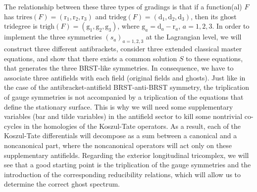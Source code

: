 \documentclass[a4paper,12pt]{article}
\begin{document}
The relationship between these three types of gradings is that if a
function(al) $F$ has $\mathrm{trires}\left( F\right) =\left( \mathrm{r}_{1},%
\mathrm{r}_{2},\mathrm{r}_{3}\right) $ and $\mathrm{trideg}\left( F\right)
=\left( \mathrm{d}_{1},\mathrm{d}_{2},\mathrm{d}_{3}\right) $, then its
ghost tridegree is $\mathrm{trigh}\left( F\right) =\left( \mathrm{g}_{1},%
\mathrm{g}_{2},\mathrm{g}_{3}\right) $, where $\mathrm{g}_{a}=\mathrm{d}_{a}-%
\mathrm{r}_{a}$, $a=1,2,3$. In order to implement the three symmetries $%
\left( s_{a}\right) _{a=1,2,3}$ at the Lagrangian level, we will construct
three different antibrackets, consider three extended classical master
equations, and show that there exists a common solution $S$ to these
equations, that generates the three BRST-like symmetries. In consequence, we
have to associate three antifields with each field (original fields and
ghosts). Just like in the case of the antibracket-antifield BRST-anti-BRST
symmetry, the triplication of gauge symmetries is not accompanied by a
triplication of the equations that define the stationary surface. This is
why we will need some supplementary variables (bar and tilde variables) in
the antifield sector to kill some nontrivial co-cycles in the homologies of
the Koszul-Tate operators. As a result, each of the Koszul-Tate
differentials will decompose as a sum between a canonical and a noncanonical
part, where the noncanonical operators will act only on these supplementary
antifields. Regarding the exterior longitudinal tricomplex, we will see that
a good starting point is the triplication of the gauge symmetries and the
introduction of the corresponding reducibility relations, which will allow
us to determine the correct ghost spectrum.
\end{document}
